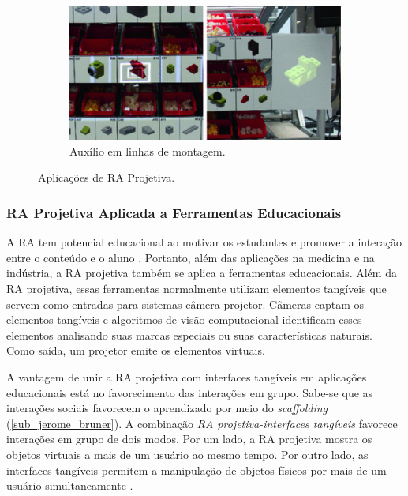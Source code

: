 \begin{figure}
\begin{subfigure}{.33\textwidth}
        \centering
        \includegraphics[width=.9\linewidth,fbox]{figs/sand.png}
        \caption{Auxílio em linhas de montagem.}
        \label{fig_sand}
    \end{subfigure}%
    \caption{Aplicações de RA Projetiva.}
    \label{fig_proj_ra_applications}
\end{figure}

\subsubsection{RA Projetiva Aplicada a Ferramentas Educacionais}
\label{sub_sub_aplicacoes_ra_projetiva_educacao}

A \ac{RA} tem potencial educacional ao motivar os estudantes e promover a interação entre o conteúdo e o aluno \cite{silva_evaluating_2013}. Portanto, além das aplicações na medicina e na indústria, a RA projetiva também se aplica a ferramentas educacionais. Além da RA projetiva, essas ferramentas normalmente utilizam elementos tangíveis que servem como entradas para sistemas câmera-projetor. Câmeras captam os elementos tangíveis e algoritmos de visão computacional identificam esses elementos analisando suas marcas especiais ou suas características naturais. Como saída, um projetor emite os elementos virtuais.

A vantagem de unir a RA projetiva com interfaces tangíveis em aplicações educacionais está no favorecimento das interações em grupo. Sabe-se que as interações sociais favorecem o aprendizado por meio do \textit{scaffolding} (\autoref{sub_jerome_bruner}). A combinação \textit{RA projetiva-interfaces tangíveis} favorece interações em grupo de dois modos. Por um lado, a RA projetiva mostra os objetos virtuais a mais de um usuário ao mesmo tempo. Por outro lado, as interfaces tangíveis permitem a manipulação de objetos físicos por mais de um usuário simultaneamente \cite{burleson_active_2018, horn_tangible_2012}.

